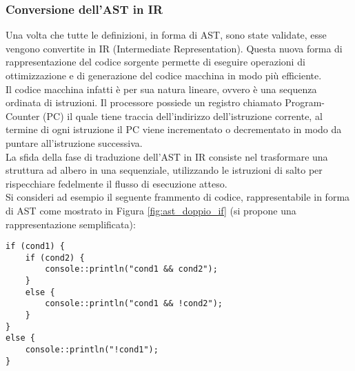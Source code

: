 \subsubsection{Conversione dell'AST in IR}
Una volta che tutte le definizioni, in forma di AST, sono state validate, esse vengono convertite in IR 
(Intermediate Representation). Questa nuova forma di rappresentazione del codice sorgente permette di
eseguire operazioni di ottimizzazione e di generazione del codice macchina in modo più efficiente. \\

Il codice macchina infatti è per sua natura lineare, ovvero è una sequenza ordinata di istruzioni. Il processore 
possiede un registro chiamato Program-Counter (PC) il quale tiene traccia dell'indirizzo dell'istruzione corrente, 
al termine di ogni istruzione il PC viene incrementato o decrementato in modo da puntare all'istruzione successiva. \\

La sfida della fase di traduzione dell'AST in IR consiste nel trasformare una struttura ad albero in una sequenziale,
utilizzando le istruzioni di salto per rispecchiare fedelmente il flusso di esecuzione atteso. \\

Si consideri ad esempio il seguente frammento di codice, rappresentabile in forma di AST 
come mostrato in Figura \ref{fig:ast_doppio_if} (si propone una rappresentazione semplificata):

\vspace{0.5cm}
\begin{lstlisting}[frame=single]
if (cond1) {
    if (cond2) {
        console::println("cond1 && cond2");
    }
    else {
        console::println("cond1 && !cond2");
    }
}
else {
    console::println("!cond1");
}    
\end{lstlisting}
\vspace{0.5cm}

